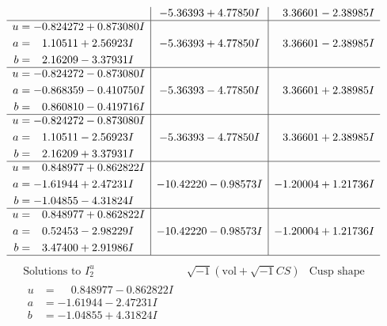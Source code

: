 \documentclass[1p]{elsarticle_modified}
\theoremstyle{definition}
\newcommand{\I}{\sqrt{-1}}
\begin{document}
$$\begin{array}{c|c|c}
 & -5.36393 + 4.77850 I & \phantom{-}3.36601 - 2.38985 I \\ \hline\begin{aligned}
u &= -0.824272 + 0.873080 I \\
a &= \phantom{-}1.10511 + 2.56923 I \\
b &= \phantom{-}2.16209 - 3.37931 I\end{aligned}
 & -5.36393 + 4.77850 I & \phantom{-}3.36601 - 2.38985 I \\ \hline\begin{aligned}
u &= -0.824272 - 0.873080 I \\
a &= -0.868359 - 0.410750 I \\
b &= \phantom{-}0.860810 - 0.419716 I\end{aligned}
 & -5.36393 - 4.77850 I & \phantom{-}3.36601 + 2.38985 I \\ \hline\begin{aligned}
u &= -0.824272 - 0.873080 I \\
a &= \phantom{-}1.10511 - 2.56923 I \\
b &= \phantom{-}2.16209 + 3.37931 I\end{aligned}
 & -5.36393 - 4.77850 I & \phantom{-}3.36601 + 2.38985 I \\ \hline\begin{aligned}
u &= \phantom{-}0.848977 + 0.862822 I \\
a &= -1.61944 + 2.47231 I \\
b &= -1.04855 - 4.31824 I\end{aligned}
 & -10.42220 - 0.98573 I & -1.20004 + 1.21736 I \\ \hline\begin{aligned}
u &= \phantom{-}0.848977 + 0.862822 I \\
a &= \phantom{-}0.52453 - 2.98229 I \\
b &= \phantom{-}3.47400 + 2.91986 I\end{aligned}
 & -10.42220 - 0.98573 I & -1.20004 + 1.21736 I\\
 \hline 
 \end{array}$$\newpage$$\begin{array}{c|c|c}  
\text{Solutions to }I^u_{2}& \I (\text{vol} + \sqrt{-1}CS) & \text{Cusp shape}\\
 \hline 
\begin{aligned}
u &= \phantom{-}0.848977 - 0.862822 I \\
a &= -1.61944 - 2.47231 I \\
b &= -1.04855 + 4.31824 I\end{aligned}

\end{array}$$
\end{document}
